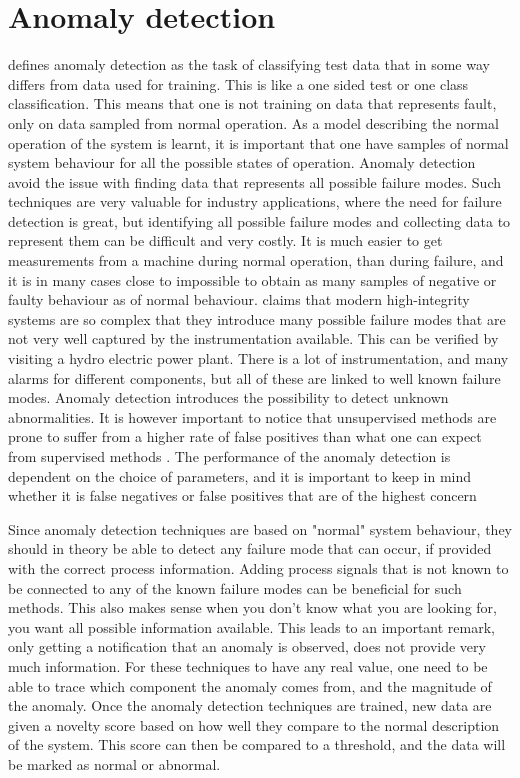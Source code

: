 \section{Anomaly detection}\label{sec:novelty_detection}
    \cite{Pimentel2014} defines anomaly detection as the task of classifying test data that in some way differs from data used for training. This is like a one sided test or one class classification. This means that one is not training on data that represents fault, only on data sampled from normal operation. As a model describing the normal operation of the system is learnt, it is important that one have samples of normal system behaviour for all the possible states of operation. Anomaly detection avoid the issue with finding data that represents all possible failure modes. Such techniques are very valuable for industry applications, where the need for failure detection is great, but identifying all possible failure modes and collecting data to represent them can be difficult and very costly. It is much easier to get measurements from a machine during normal operation, than during failure, and it is in many cases close to impossible to obtain as many samples of negative or faulty behaviour as of normal behaviour. \cite{Tarassenko2009} claims that modern high-integrity systems are so complex that they introduce many possible failure modes that are not very well captured by the instrumentation available. This can be verified by visiting a hydro electric power plant. There is a lot of instrumentation, and many alarms for different components, but all of these are linked to well known failure modes. Anomaly detection introduces the possibility to detect unknown abnormalities. It is however important to notice that unsupervised methods are prone to suffer from a higher rate of false positives than what one can expect from supervised methods \cite{Latecki}. The performance of the anomaly detection is dependent on the choice of parameters, and it is important to keep in mind whether it is false negatives or false positives that are of the highest concern 
    
    Since anomaly detection techniques are based on "normal" system behaviour, they should in theory be able to detect any failure mode that can occur, if provided with the correct process information. Adding process signals that is not known to be connected to any of the known failure modes can be beneficial for such methods. This also makes sense when  you don't know what you are looking for, you want all possible information available. This leads to an important remark, only getting a notification that an anomaly is observed, does not provide very much information. For these techniques to have any real value, one need to be able to trace which component the anomaly comes from, and the magnitude of the anomaly. Once the anomaly detection techniques are trained, new data are given a novelty score based on how well they compare to the normal description of the system. This score can then be compared to a threshold, and the data will be marked as normal or abnormal.


